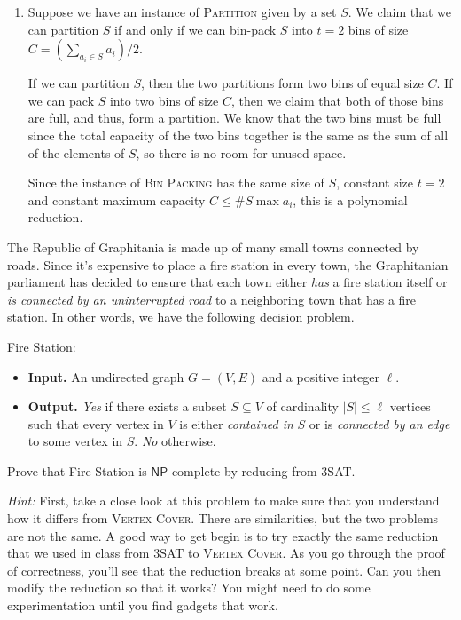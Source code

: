 \documentclass[12 pt, letterpaper]{hmcpset}
\newcommand{\NP}{$\mathsf{NP}$}
\begin{document}
\begin{solution}
\begin{enumerate}
		\item Suppose we have an instance of \textsc{Partition} given by a set $S$. We claim that we can partition $S$ if and only if we can bin-pack $S$ into $t = 2$ bins of size $C = (\sum_{a_{i} \in S} a_{i}) / 2$. 

			If we can partition $S$, then the two partitions form two bins of equal size $C$. If we can pack $S$ into two bins of size $C$, then we claim that both of those bins are full, and thus, form a partition. We know that the two bins must be full since the total capacity of the two bins together is the same as the sum of all of the elements of $S$, so there is no room for unused space.

			Since the instance of \textsc{Bin Packing} has the same size of $S$, constant size  $t = 2$ and constant maximum capacity $C \le \# S \max a_{i}$, this is a polynomial reduction.
	\end{enumerate}
\end{solution}

\pagebreak

\begin{problem}

The Republic of Graphitania is made up of many small towns connected by roads. Since it's expensive to place a fire station in every town, the Graphitanian parliament has decided to ensure that each town either \emph{has} a fire station itself or \emph{is connected by an uninterrupted road} to a neighboring town that has a fire station. In other words, we have the following decision problem. 

{\sc Fire Station}:
\begin{itemize}
    \item \textbf{Input. } An undirected graph $G=(V,E)$ and a positive integer $\ell$.
    \item \textbf{Output. } \emph{Yes} if there exists a subset $S \subseteq V$ of cardinality $|S| \leq \ell$ vertices such that every vertex in $V$ is either \emph{contained in} $S$ or is \emph{connected by an edge} to some vertex in $S$. \emph{No} otherwise.
\end{itemize}

Prove that {\sc Fire Station} is \NP-complete by reducing from {\sc 3SAT}.

\emph{Hint:} First, take a close look at this problem to make sure that you understand how it differs from \textsc{Vertex Cover}. There are similarities, but the two problems are not the same. A good way to get begin is to try exactly the same reduction that we used in class from \textsc{3SAT} to \textsc{Vertex Cover}.  As you go through the proof of correctness, you'll see that the reduction breaks at some point.  Can you then modify the reduction so that it works? You might need to do some experimentation until you find gadgets that work.
\end{problem}
\end{document}

